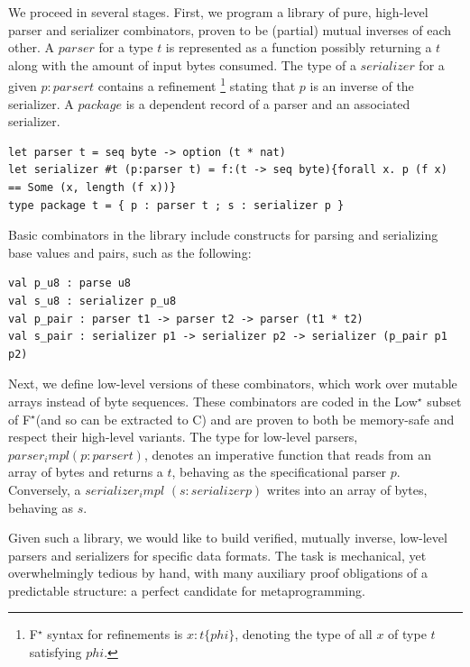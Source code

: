 \documentclass[runningheads]{llncs}
\newcommand\fstar{F$^\star$\xspace}
\newcommand\lowstar{Low$^\star$\xspace}
\newcommand{\comm}[3]{\ifcheckpagebudget\else\ifdraft{{\color{#1}[#2: #3]}}\fi\fi}
\newcommand{\ch}[1]{\comm{teal}{CH}{#1}}
\begin{document}
We proceed in several stages. First, we program a library of pure, high-level parser
and serializer combinators, proven to be (partial) mutual inverses of
each other.
%
A \ls$parser$ for a type \ls$t$
is represented as a function possibly returning a \ls$t$ along with
the amount of input bytes consumed.
%
The type of a \ls$serializer$ for
a given \ls$p:parser t$ contains a refinement%
\footnote{
\fstar syntax for refinements is \ls$x:t\{phi\}$, denoting
the type of all \ls$x$ of type \ls$t$ satisfying \ls$phi$.
%
}
stating that \ls$p$ is an
inverse of the serializer.
%
A \ls$package$ is a dependent record of a
parser and an associated serializer.
%
\begin{lstlisting}
let parser t = seq byte -> option (t * nat)
let serializer #t (p:parser t) = f:(t -> seq byte){forall x. p (f x) == Some (x, length (f x))}
type package t = { p : parser t ; s : serializer p }
\end{lstlisting}
%
Basic combinators in the library include constructs for parsing
and serializing base values and pairs, such as the following:
\begin{lstlisting}
val p_u8 : parse u8
val s_u8 : serializer p_u8
val p_pair : parser t1 -> parser t2 -> parser (t1 * t2)
val s_pair : serializer p1 -> serializer p2 -> serializer (p_pair p1 p2)
\end{lstlisting}
%
%
Next, we define low-level versions of these combinators, which work over
mutable arrays instead of byte sequences.
%
These combinators are coded in the \lowstar subset of \fstar (and so can be
extracted to C) and are proven to both be memory-safe
and respect their high-level variants.
%
The type for low-level parsers,
\ls$parser_impl (p:parser t)$, denotes
an imperative function that reads from an array of bytes and
returns a \ls$t$,
behaving as the specificational
parser \ls$p$.
%
Conversely, a \ls$serializer_impl$ \ls$(s:serializer p)$
writes into an array of bytes, behaving as \ls$s$.

Given such a library, we would like to build verified, mutually
inverse, low-level parsers and serializers for specific data
formats. The task is mechanical, yet overwhelmingly tedious
by hand, with many auxiliary proof obligations of a predictable
structure: a perfect candidate for metaprogramming.
\end{document}
